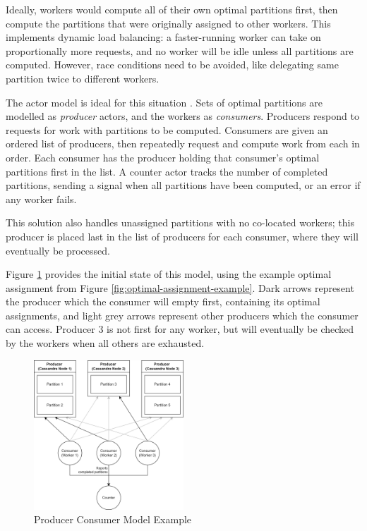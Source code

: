 Ideally, workers would compute all of their own optimal partitions first, then compute the partitions that were originally assigned to other workers. This implements dynamic load balancing: a faster-running worker can take on proportionally more requests, and no worker will be idle unless all partitions are computed. However, race conditions need to be avoided, like delegating same partition twice to different workers.

The actor model is ideal for this situation \cite{hewitt1973session}. Sets of optimal partitions are modelled as \textit{producer} actors, and the workers as \textit{consumers}. Producers respond to requests for work with partitions to be computed. Consumers are given an ordered list of producers, then repeatedly request and compute work from each in order. Each consumer has the producer holding that consumer's optimal partitions first in the list. A counter actor tracks the number of completed partitions, sending a signal when all partitions have been computed, or an error if any worker fails.

This solution also handles unassigned partitions with no co-located workers; this producer is placed last in the list of producers for each consumer, where they will eventually be processed.

Figure \ref{fig:producer-consumer-model-example} provides the initial state of this model, using the example optimal assignment from Figure \ref{fig:optimal-assignment-example}. Dark arrows represent the producer which the consumer will empty first, containing its optimal assignments, and light grey arrows represent other producers which the consumer can access. Producer 3 is not first for any worker, but will eventually be checked by the workers when all others are exhausted.

\begin{figure}[h]
	\centering
	\includegraphics[width=0.5\textwidth]{chapters/diagrams/implementation/producer-consumer-model-example}
	\caption{Producer Consumer Model Example}
	\label{fig:producer-consumer-model-example}
\end{figure}

